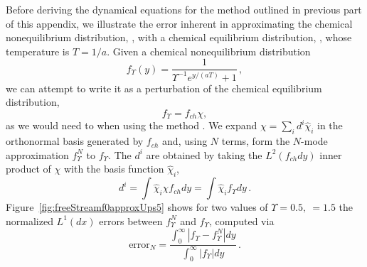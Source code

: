 Before deriving the dynamical equations for the method outlined in previous part of this appendix,
we illustrate the error inherent in approximating the chemical nonequilibrium distribution, ,  with a  chemical equilibrium distribution, , whose temperature is $T=1/a$.   Given a chemical nonequilibrium distribution 
\begin{equation}\label{zerothApprox}
f_\Upsilon (y)=\frac{1}{\Upsilon^{-1}e^{y/(aT)}+1}\,,
\end{equation}
 we can attempt to write it as a perturbation of the chemical equilibrium distribution,  
\begin{equation}\label{chiDef}
f_\Upsilon=f_{ch}\chi,
\end{equation} as we would need to when using the method .  We expand $\chi=\sum_i d^i\hat\chi_i$ in the orthonormal basis generated by $f_{ch}$ and, using $N$ terms, form the $N$-mode approximation $f_\Upsilon^N$ to $f_\Upsilon$.  The $d^i$ are obtained by taking the $L^2(f_{ch}dy)$ inner product of $\chi$ with the basis function $\hat\chi_i$,
\begin{equation}
d^i=\int\hat\chi_i \chi f_{ch}dy=\int\hat\chi_i  f_\Upsilon dy\,.
\end{equation}
 Figure~\ref{fig:freeStreamf0approxUps5} 
 shows for two values of $\Upsilon=0.5,\ =1.5$ the normalized $L^1(dx)$ errors between $f_\Upsilon^N$ and $f_\Upsilon$, computed via
\begin{equation}
\text{error}_N=\frac{\int_0^\infty |f_\Upsilon -f_\Upsilon ^N|dy}{\int_0^\infty |f_\Upsilon |dy}\,.
\end{equation}

